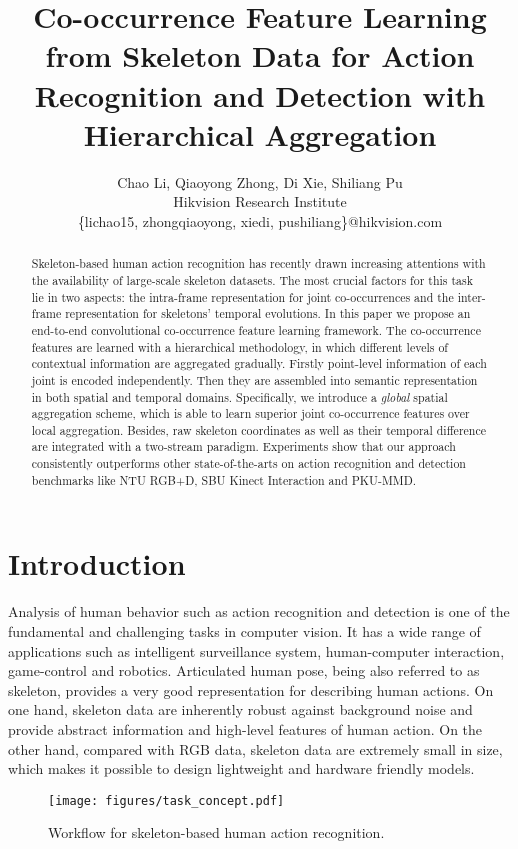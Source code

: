 \documentclass{article}
\title{
Co-occurrence Feature Learning from Skeleton Data for Action Recognition and Detection with Hierarchical Aggregation
}
\author{
Chao Li,
Qiaoyong Zhong,
Di Xie,
Shiliang Pu
\\
Hikvision Research Institute \\
\{lichao15, zhongqiaoyong, xiedi, pushiliang\}@hikvision.com
}
\begin{document}
\maketitle

\begin{abstract}
  Skeleton-based human action recognition has recently drawn increasing attentions with the availability of large-scale skeleton datasets. The most crucial factors for this task lie in two aspects: the intra-frame representation for joint co-occurrences and the inter-frame representation for skeletons' temporal evolutions. In this paper we propose an end-to-end convolutional co-occurrence feature learning framework. The co-occurrence features are learned with a hierarchical methodology, in which different levels of contextual information are aggregated gradually. Firstly point-level information of each joint is encoded independently. Then they are assembled into semantic representation in both spatial and temporal domains. Specifically, we introduce a \emph{global} spatial aggregation scheme, which is able to learn superior joint co-occurrence features over local aggregation. Besides, raw skeleton coordinates as well as their temporal difference are integrated with a two-stream paradigm. Experiments show that our approach consistently outperforms other state-of-the-arts on action recognition and detection benchmarks like NTU RGB+D, SBU Kinect Interaction and PKU-MMD.
\end{abstract}

\section{Introduction}

Analysis of human behavior such as action recognition and detection is one of the fundamental and challenging tasks in computer vision. It has a wide range of applications such as intelligent surveillance system, human-computer interaction, game-control and robotics. Articulated human pose, being also referred to as skeleton, provides a very good representation for describing human actions. On one hand, skeleton data are inherently robust against background noise and provide abstract information and high-level features of human action. On the other hand, compared with RGB data, skeleton data are extremely small in size, which makes it possible to design lightweight and hardware friendly models.

\begin{figure}[htbp]
  \centering
  \texttt{[image: figures/task\_concept.pdf]}
  \caption{Workflow for skeleton-based human action recognition.}
  \label{fig:workflow}
\end{figure}
\end{document}
